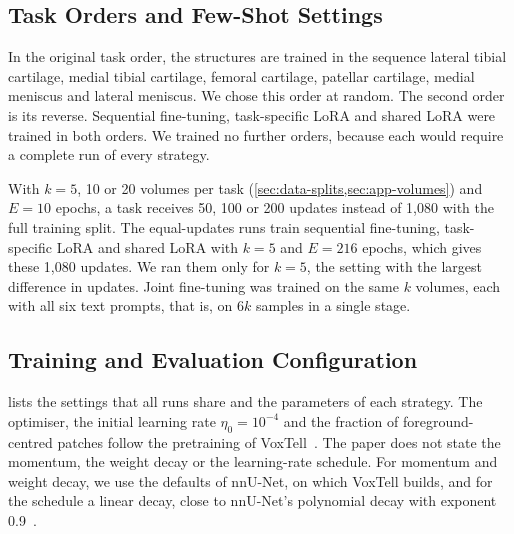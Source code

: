 \subsection{Task Orders and Few-Shot Settings}
\label{subsec:exp-data}

In the original task order, the structures are trained in the sequence lateral tibial cartilage, medial tibial cartilage, femoral cartilage, patellar cartilage, medial meniscus and lateral meniscus.
We chose this order at random.
The second order is its reverse.
Sequential fine-tuning, task-specific LoRA and shared LoRA were trained in both orders.
We trained no further orders, because each would require a complete run of every strategy.

\begin{table}[tb] %
\centering
\caption[Overview of the experiments]{Overview of the experiments. Training volumes per task: 108 is the full training split. Objective: number of the research objective in \cref{sec:intro-rq}. All runs use the original task order unless stated otherwise.}
\label{tab:ch6_experiments}

\end{table}

With $k = 5$, 10 or 20 volumes per task (\cref{sec:data-splits,sec:app-volumes}) and $E = 10$ epochs, a task receives 50, 100 or 200 updates instead of 1{,}080 with the full training split.
The equal-updates runs train sequential fine-tuning, task-specific LoRA and shared LoRA with $k = 5$ and $E = 216$ epochs, which gives these 1{,}080 updates.
We ran them only for $k = 5$, the setting with the largest difference in updates.
Joint fine-tuning was trained on the same $k$ volumes, each with all six text prompts, that is, on $6k$ samples in a single stage.

\subsection{Training and Evaluation Configuration}
\label{subsec:exp-config}

 lists the settings that all runs share and the parameters of each strategy.
The optimiser, the initial learning rate $\eta_0 = 10^{-4}$ and the fraction of foreground-centred patches follow the pretraining of VoxTell~\cite[Suppl.~Sec.~A]{rokuss2025voxtellfreetextpromptableuniversal}.
The paper does not state the momentum, the weight decay or the learning-rate schedule.
For momentum and weight decay, we use the defaults of nnU-Net, on which VoxTell builds, and for the schedule a linear decay, close to nnU-Net's polynomial decay with exponent 0.9~\cite{isensee2026nnunet}.

